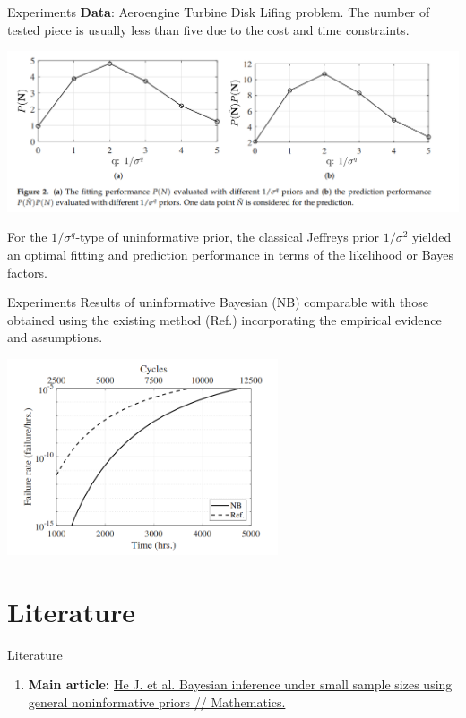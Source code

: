 \documentclass{beamer}
\begin{document}
\begin{frame}{Experiments}
    \textbf{Data}: Aeroengine Turbine Disk Lifing problem. The number of tested piece is usually less than five due to the cost and time constraints.
    \vspace{-0.1cm}
       \begin{center}
        \includegraphics[width=1\textwidth]{figs/exp2.png}
        \end{center}
For the $1/\sigma^q$-type of uninformative prior, the classical Jeffreys prior $1/\sigma^2$ yielded an optimal fitting and prediction performance in terms of the likelihood or Bayes factors.
\end{frame}

\begin{frame}{Experiments}
    Results of uninformative Bayesian (NB) comparable with those obtained
    using the existing method (Ref.) incorporating the empirical evidence and assumptions.
\begin{center}
    \includegraphics[width=0.6\textwidth]{figs/exp3.png}

\end{center}
\end{frame}

\section{Literature}
\begin{frame}{Literature}
    \begin{enumerate}
        \item \textbf{Main article:} \href{https://www.mdpi.com/2227-7390/9/21/2810}
        {He J. et al. Bayesian inference under small sample sizes using general noninformative priors // Mathematics.}
    \end{enumerate}
\end{frame}
\end{document}
